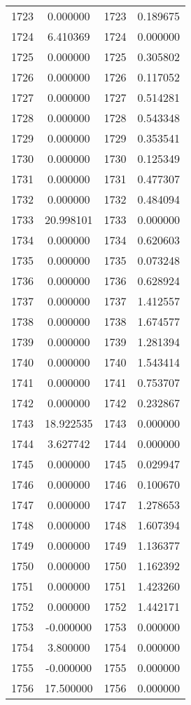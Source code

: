 \documentclass[12pt]{article}
\begin{document}
\begin{longtable}{@{}cccc@{}}
1723 & 0.000000 & 1723 & 0.189675 \\
1724 & 6.410369 & 1724 & 0.000000 \\
1725 & 0.000000 & 1725 & 0.305802 \\
1726 & 0.000000 & 1726 & 0.117052 \\
1727 & 0.000000 & 1727 & 0.514281 \\
1728 & 0.000000 & 1728 & 0.543348 \\
1729 & 0.000000 & 1729 & 0.353541 \\
1730 & 0.000000 & 1730 & 0.125349 \\
1731 & 0.000000 & 1731 & 0.477307 \\
1732 & 0.000000 & 1732 & 0.484094 \\
1733 & 20.998101 & 1733 & 0.000000 \\
1734 & 0.000000 & 1734 & 0.620603 \\
1735 & 0.000000 & 1735 & 0.073248 \\
1736 & 0.000000 & 1736 & 0.628924 \\
1737 & 0.000000 & 1737 & 1.412557 \\
1738 & 0.000000 & 1738 & 1.674577 \\
1739 & 0.000000 & 1739 & 1.281394 \\
1740 & 0.000000 & 1740 & 1.543414 \\
1741 & 0.000000 & 1741 & 0.753707 \\
1742 & 0.000000 & 1742 & 0.232867 \\
1743 & 18.922535 & 1743 & 0.000000 \\
1744 & 3.627742 & 1744 & 0.000000 \\
1745 & 0.000000 & 1745 & 0.029947 \\
1746 & 0.000000 & 1746 & 0.100670 \\
1747 & 0.000000 & 1747 & 1.278653 \\
1748 & 0.000000 & 1748 & 1.607394 \\
1749 & 0.000000 & 1749 & 1.136377 \\
1750 & 0.000000 & 1750 & 1.162392 \\
1751 & 0.000000 & 1751 & 1.423260 \\
1752 & 0.000000 & 1752 & 1.442171 \\
1753 & -0.000000 & 1753 & 0.000000 \\
1754 & 3.800000 & 1754 & 0.000000 \\
1755 & -0.000000 & 1755 & 0.000000 \\
1756 & 17.500000 & 1756 & 0.000000 \\

\end{longtable}
\end{document}
